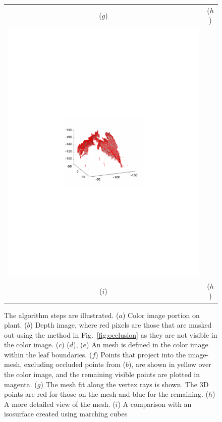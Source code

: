 \begin{figure}
\begin{center}
\begin{tabular}{cc}
($g$) & ($h$) \\
\includegraphics[trim=190 280 190 290,clip,width=0.48\linewidth]{Figures/bean3DIsosurface} & \\
($i$) & ($h$) \\
\end{tabular}
\end{center}
   \caption{The algorithm steps are illustrated.  ($a$) Color image portion on plant.  ($b$) Depth image, where red pixels are those that are masked out using the method in Fig.~\ref{fig:occlusion} as they are not visible in the color image. ($c$) ($d$), ($e$) An mesh is defined in the color image within the leaf boundaries. ($f$) Points that project into the image-mesh, excluding occluded points from ($b$), are shown in yellow over the color image, and the remaining visible points are plotted in magenta.  ($g$) The mesh fit along the vertex rays is shown.  The $3$D points are red for those on the mesh and blue for the remaining.  ($h$) A more detailed view of the mesh. ($i$) A comparison with an isosurface created using marching cubes~\cite{} }
\label{fig:sigmainterframe}
\end{figure}


